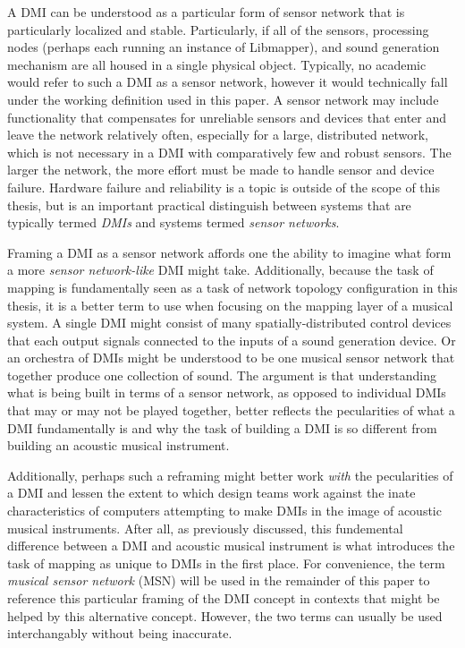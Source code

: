 A DMI can be understood as a particular form of sensor network that is particularly localized and stable. Particularly, if all of the sensors, processing nodes (perhaps each running an instance of Libmapper), and sound generation mechanism are all housed in a single physical object. Typically, no academic would refer to such a DMI as a sensor network, however it would technically fall under the working definition used in this paper. A sensor network may include functionality that compensates for unreliable sensors and devices that enter and leave the network relatively often, especially for a large, distributed network, which is not necessary in a DMI with comparatively few and robust sensors. The larger the network, the more effort must be made to handle sensor and device failure. Hardware failure and reliability is a topic is outside of the scope of this thesis, but is an important practical distinguish between systems that are typically termed \emph{DMIs} and systems termed \emph{sensor networks}.

Framing a DMI as a sensor network affords one the ability to imagine what form a more \emph{sensor network-like} DMI might take. Additionally, because the task of mapping is fundamentally seen as a task of network topology configuration in this thesis, it is a better term to use when focusing on the mapping layer of a musical system. A single DMI might consist of many spatially-distributed control devices that each output signals connected to the inputs of a sound generation device. Or an orchestra of DMIs might be understood to be one musical sensor network that together produce one collection of sound. The argument is that understanding what is being built in terms of a sensor network, as opposed to individual DMIs that may or may not be played together, better reflects the pecularities of what a DMI fundamentally is and why the task of building a DMI is so different from building an acoustic musical instrument.

Additionally, perhaps such a reframing might better work \emph{with} the pecularities of a DMI and lessen the extent to which design teams work against the inate characteristics of computers attempting to make DMIs in the image of acoustic musical instruments. After all, as previously discussed, this fundemental difference between a DMI and acoustic musical instrument is what introduces the task of mapping as unique to DMIs in the first place. For convenience, the term \emph{musical sensor network} (MSN) will be used in the remainder of this paper to reference this particular framing of the DMI concept in contexts that might be helped by this alternative concept. However, the two terms can usually be used interchangably without being inaccurate. 

